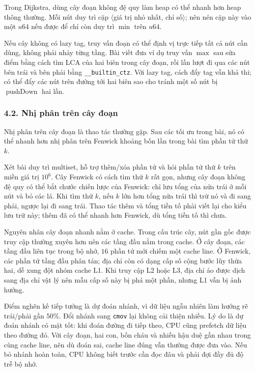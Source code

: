 \documentclass[11pt]{article}
\begin{document}
Trong Dijkstra, dùng cây đoạn không đệ quy làm heap có thể nhanh hơn heap thông
thường. Mỗi nút duy trì cặp \(\langle\)giá trị nhỏ nhất, chỉ số\(\rangle\);
nên nén cặp này vào một \(u64\) nếu được để chỉ còn duy trì \(\min\) trên
\(u64\).

Nếu cây không có lazy tag, truy vấn đoạn có thể định vị trực tiếp tất cả nút
cần dùng, không phải nhảy từng tầng. Bài viết đưa ví dụ truy vấn \(\max\) sau
sửa điểm bằng cách tìm LCA của hai biên trong cây đoạn, rồi lần lượt đi qua các
nút bên trái và bên phải bằng \texttt{\_\_builtin\_ctz}. Với lazy tag, cách
đẩy tag vẫn khả thi; có thể đẩy các nút trên đường tới hai biên sao cho tránh
một số nút bị \(\operatorname{pushDown}\) hai lần.

\subsubsection*{4.2. Nhị phân trên cây đoạn}

Nhị phân trên cây đoạn là thao tác thường gặp. Sau các tối ưu trong bài, nó có
thể nhanh hơn nhị phân trên Fenwick khoảng bốn lần trong bài tìm phần tử thứ
\(k\).

Xét bài duy trì multiset, hỗ trợ thêm/xóa phần tử và hỏi phần tử thứ \(k\) trên
miền giá trị \(10^6\). Cây Fenwick có cách tìm thứ \(k\) rất gọn, nhưng cây
đoạn không đệ quy có thể bắt chước chiến lược của Fenwick: chỉ lưu tổng của
nửa trái ở mỗi nút và bỏ các lá. Khi tìm thứ \(k\), nếu \(k\) lớn hơn tổng nửa
trái thì trừ nó và đi sang phải, ngược lại đi sang trái. Thao tác thêm và tổng
tiền tố phải viết lại cho kiểu lưu trữ này; thêm đã có thể nhanh hơn Fenwick,
dù tổng tiền tố thì chưa.

Nguyên nhân cây đoạn nhanh nằm ở cache. Trong cấu trúc cây, nút gần gốc được
truy cập thường xuyên hơn nên các tầng đầu nằm trong cache. Ở cây đoạn, các
tầng đầu liên tục trong bộ nhớ, \(16\) phần tử mới chiếm một cache line. Ở
Fenwick, các phần tử tầng đầu phân tán; địa chỉ còn có dạng cấp số cộng bước
lũy thừa hai, dễ xung đột nhóm cache L1. Khi truy cập L2 hoặc L3, địa chỉ ảo
được dịch sang địa chỉ vật lý nên mẫu cấp số này bị phá một phần, nhưng L1 vẫn
bị ảnh hưởng.

Điểm nghẽn kế tiếp tưởng là dự đoán nhánh, vì dữ liệu ngẫu nhiên làm hướng rẽ
trái/phải gần \(50\%\). Đổi nhánh sang \texttt{cmov} lại không cải thiện nhiều.
Lý do là dự đoán nhánh có mặt tốt: khi đoán đường đi tiếp theo, CPU cũng
prefetch dữ liệu theo đường đó. Với cây đoạn, hai con, bốn cháu và nhiều hậu duệ
gần nhau trong cùng cache line, nên dù đoán sai, cache line đúng vẫn thường
được đưa vào. Nếu bỏ nhánh hoàn toàn, CPU không biết trước cần đọc đâu và phải
đợi đầy đủ độ trễ bộ nhớ.
\end{document}
